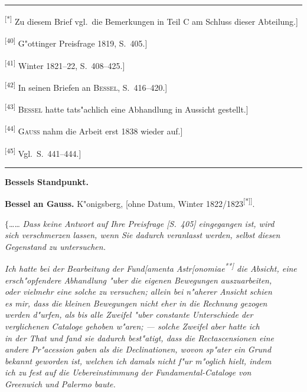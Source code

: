 \documentclass[12pt,a4paper]{article}
\theoremstyle{plain}
\theoremstyle{definition}
\theoremstyle{remark}
\begin{document}
\rule{\textwidth}{0.4pt}
{\small
\textsuperscript{[*]} Zu diesem Brief vgl.\ die Bemerkungen in Teil C am Schluss dieser Abteilung.]

\textsuperscript{[40]} G"ottinger Preisfrage 1819, S.\ 405.]

\textsuperscript{[41]} Winter 1821--22, S.\ 408--425.]

\textsuperscript{[42]} In seinen Briefen an \textsc{Bessel}, S.\ 416--420.]

\textsuperscript{[43]} \textsc{Bessel} hatte tats"achlich eine Abhandlung in Aussicht gestellt.]

\textsuperscript{[44]} \textsc{Gauss} nahm die Arbeit erst 1838 wieder auf.]

\textsuperscript{[45]} Vgl.\ S.\ 441--444.]
}
\rule{\textwidth}{0.4pt}


\newpage
\begin{center}
\textbf{Bessels Standpunkt.}
\end{center}

\vspace{1em}
\begin{center}
\textbf{Bessel an Gauss.} \quad K"onigsberg, [ohne Datum, Winter 1822/1823\textsuperscript{[*]]}.
\end{center}

\noindent
$\{$\ldots{}\ldots{} {\itshape Dass keine Antwort auf Ihre Preisfrage [S.\ 405] eingegangen ist, wird} \\ {\itshape sich verschmerzen lassen, wenn Sie dadurch veranlasst werden, selbst diesen} \\ {\itshape Gegenstand zu untersuchen.}

{\itshape Ich hatte bei der Bearbeitung der Fund[amenta Astr[onomiae\textsuperscript{**]} die Absicht, eine} \\ {\itshape ersch"opfendere Abhandlung "uber die eigenen Bewegungen auszuarbeiten,} \\ {\itshape oder vielmehr eine solche zu versuchen; allein bei n"aherer Ansicht schien} \\ {\itshape es mir, dass die kleinen Bewegungen nicht eher in die Rechnung gezogen} \\ {\itshape werden d"urfen, als bis alle Zweifel "uber constante Unterschiede der} \\ {\itshape verglichenen Cataloge gehoben w"aren; --- solche Zweifel aber hatte ich} \\ {\itshape in der That und fand sie dadurch best"atigt, dass die Rectascensionen eine} \\ {\itshape andere Pr"acession gaben als die Declinationen, wovon sp"ater ein Grund} \\ {\itshape bekannt geworden ist, welchen ich damals nicht f"ur m"oglich hielt, indem} \\ {\itshape ich zu fest auf die Uebereinstimmung der Fundamental-Cataloge von} \\ {\itshape Greenwich und Palermo baute.}
\end{document}
